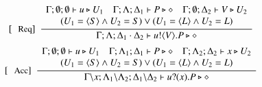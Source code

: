 \begin{figure}[t]
\[\begin{array}{c}
		\trule{Req}~~\tree{
			\begin{array}{c}
				\Gamma; \es; \es \proves u \hastype U_1
				\quad
				\Gamma; \Lambda; \Delta_1 \proves P \hastype \Proc
				\quad
				\Gamma; \es; \Delta_2 \proves V \hastype U_2
				\\
				(U_1 = \chtype{S} 
                                \land %
                                U_2 = S)
				\lor
				 (U_1 = \chtype{L} 
                                \land %
                                 U_2 = L)
			\end{array}
		}{
			\Gamma; \Lambda; \Delta_1 \cat \Delta_2 \proves \bout{u}{V} P \hastype \Proc
		}
		\\[4mm]

		\trule{Acc}~~\tree{
			\begin{array}{c}
				\Gamma; \emptyset; \emptyset \proves u \hastype U_1 
				\quad
				\Gamma; \Lambda_1; \Delta_1 \proves P \hastype \Proc
				\quad
				\Gamma; \Lambda_2; \Delta_2 \proves x \hastype U_2\\
				(U_1 = \chtype{S} 
                                \land %
                                U_2 = S)
				\lor
				 (U_1 = \chtype{L} 
                                \land %
                                 U_2 = L)
	               \end{array}
		}{
			\Gamma\backslash x; \Lambda_1 \backslash \Lambda_2; \Delta_1 \backslash \Delta_2 \proves \binp{u}{x} P \hastype \Proc
		}
%
%
%

\end{array}\]
\end{figure}
